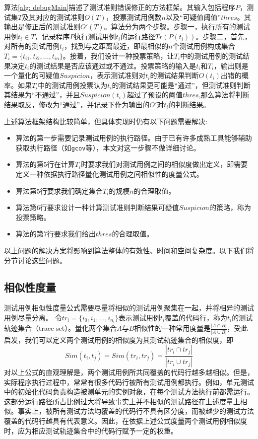 算法\ref{alg: debugMain}描述了测试准则错误修正的方法框架。其输入包括程序$P$，测试集$T$及其对应的测试准则$O(T)$，投票测试用例数$n$以及“可疑值阈值”$thres$。其输出是修正后的测试准则$O'(T)$。算法分为两个步骤。步骤一，执行所有的测试用例$t_i \in T$，记录程序$P$执行测试用例$t_i$的运行路径$Tr(P(t_i))$。步骤二，首先，对所有的测试用例$t_i$，找到与之距离最近，即最相似的$n$个测试用例构成集合$T_i = \{t_{i1}, t_{i2}, \ldots, t_{in}\}$。接着，我们设计一种投票策略，让$T_i$中的测试用例的测试结果决定$t_i$的测试结果是否应该通过或不通过。投票策略的输入是$t_i$和$T_i$，输出则是一个量化的可疑值$Suspicion$，表示测试准则对$t_i$的测试结果判断$O(t_i)$出错的概率。如果$T_i$中的测试用例投票认为$t_i$的测试结果更可能是“通过”，但测试准则判断其结果为“不通过”，并且$Suspicion(t_i)$超过了预设的阈值$thres$,那么算法将判断结果取反，修改为“通过”，并记录下作为输出的$O'$对$t_i$的判断结果。

上述算法框架结构比较简单，但具体实现时仍有以下问题需要解决:
\begin{itemize}
	\item 算法的第一步需要记录测试用例的执行路径。由于已有许多成熟工具能够辅助获取执行路径（如\texttt{gcov}等），本文对这一步骤不做详细讨论。
	\item 算法的第5行在计算$T_i$时要求我们对测试用例之间的相似度做出定义，即需要定义一种依据执行路径量化测试用例之间相似性的度量公式。
	\item 算法第5行要求我们确定集合$T_i$的规模$n$的合理取值。
	\item 算法第6行要求设计一种计算测试准则判断结果可疑值$Suspicion$的策略，称为投票策略。
	\item 算法的第7行要求我们给出$thres$的合理取值。
\end{itemize}
以上问题的解决方案将影响到算法整体的有效性、时间和空间复杂度。以下我们将分节讨论这些问题。

\subsection{相似性度量}

测试用例相似性度量公式需要尽量将相似的测试用例聚集在一起，并将相异的测试用例尽量分离。
令${tr}_i = \{i_0, i_1, \ldots, i_{n_i}\}$表示测试用例$t_i$覆盖的代码行，称为$t_i$的测试轨迹集合（trace set）。量化两个集合$A$与$B$相似性的一种常用度量是$\frac{|A \cap B|}{|A \cup B|}$，受此启发，我们可以定义两个测试用例的相似度为其测试轨迹集合的相似度，即
$$
Sim(t_i, t_j) = Sim({tr}_i, {tr}_j) =\frac{|{tr}_i \cap {tr}_j|}{|{tr}_i \cup {tr}_j|}
$$
对以上公式的直观理解是，两个测试用例所共同覆盖的代码行越多越相似。但是，实际程序执行过程中，常常有很多代码行被所有测试用例都执行。例如，单元测试中的初始化代码负责构造被测单元的实例对象，在每个测试方法执行前都需运行。这部分运行路径所占比例过大将导致事实上并不相似的测试路径在上述度量上相似。事实上，被所有测试方法均覆盖的代码行不具有区分度，而被越少的测试方法覆盖的代码行越具有代表意义。因此，在依据上述公式度量两个测试用例相似度时，应为相应测试轨迹集合中的代码行赋予一定的权重。

